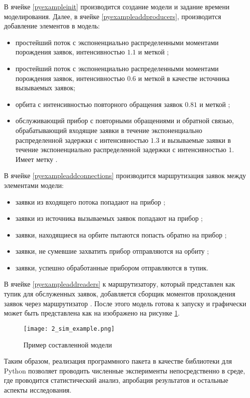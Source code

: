 В ячейке \ref{pyexampleinit} производится создание модели и задание времени моделирования. Далее, в ячейке \ref{pyexampleaddproducers}, производится добавление элементов в модель:
\begin{itemize}
\item простейший поток с экспоненциально распределенными моментами порождения заявок, интенсивностью $1.1$ и меткой ;
\item простейший поток с экспоненциально распределенными моментами порождения заявок, интенсивностью $0.6$ и меткой  в качестве источника вызываемых заявок;
\item орбита с интенсивностью повторного обращения заявок $0.81$ и меткой ;
\item обслуживающий прибор с повторными обращениями и обратной связью, обрабатывающий входящие заявки в течение экспоненциально распределенной задержки с интенсивностью $1.3$ и вызываемые заявки в течение экспоненциально распределенной задержки с интенсивностью $1$. Имеет метку .
\end{itemize}

В ячейке \ref{pyexampleaddconnections} производится маршрутизация заявок между элементами модели:
\begin{itemize}
	\item заявки из входящего потока  попадают на прибор ;
	\item заявки из источника вызываемых заявок  попадают на прибор ;
	\item заявки, находящиеся на орбите  пытаются попасть обратно на прибор ;
	\item заявки, не сумевшие захватить прибор  отправляются на орбиту ;
	\item заявки, успешно обработанные прибором  отправляются в тупик.
\end{itemize}

В ячейке \ref{pyexampleaddreaders} к маршрутизатору, который представлен как тупик для обслуженных заявок, добавляется сборщик моментов прохождения заявок через маршрутизатор . После этого модель готова к запуску и графически может быть представлена как на изображено на рисунке \ref{py_example_model}.

\begin{figure}[H]
	\centering
	\texttt{[image: 2\_sim\_example.png]}
	\caption{Пример составленной модели}
	\label{py_example_model}
\end{figure}
 
 Таким образом, реализация программного пакета в качестве библиотеки для Python позволяет проводить численные эксперименты непосредственно в среде, где проводится статистический анализ, апробация результатов и остальные аспекты исследования.
\clearpage